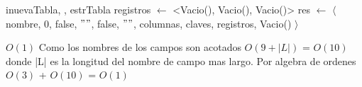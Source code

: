 \begin{Algoritmos}

  \begin{algoritmo}{inuevaTabla}{, , }{estrTabla}
	registros $\leftarrow$ <Vacio(), Vacio(), Vacio()> 
    res $\leftarrow$ $\langle$ nombre, 0, false, $""$, false, $""$, columnas, claves, registros, Vacio() $\rangle$ 
  
  \end{algoritmo}
  \datosAlgoritmo{} %
  {} %
  {} %
  {$O(1)$} %
  {Como los nombres de los campos son acotados $O(9 + |L|)$ = $O(10)$ donde |L| es la longitud del nombre de campo mas largo. Por algebra de ordenes $O(3)$ + $O(10)$ = $O(1)$} %
  

\end{Algoritmos}
